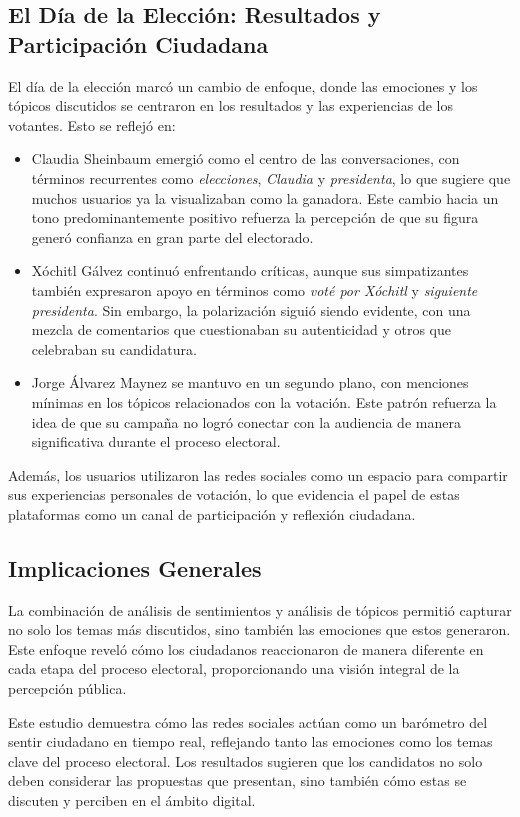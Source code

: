 \documentclass[10pt, a4paper]{article}
\begin{document}
	\subsection{El Día de la Elección: Resultados y Participación Ciudadana}
	El día de la elección marcó un cambio de enfoque, donde las emociones y los tópicos discutidos se centraron en los resultados y las experiencias de los votantes. Esto se reflejó en:
	\begin{itemize}
		\item Claudia Sheinbaum emergió como el centro de las conversaciones, con términos recurrentes como \textit{elecciones}, \textit{Claudia} y \textit{presidenta}, lo que sugiere que muchos usuarios ya la visualizaban como la ganadora. Este cambio hacia un tono predominantemente positivo refuerza la percepción de que su figura generó confianza en gran parte del electorado.
		\item Xóchitl Gálvez continuó enfrentando críticas, aunque sus simpatizantes también expresaron apoyo en términos como \textit{voté por Xóchitl} y \textit{siguiente presidenta}. Sin embargo, la polarización siguió siendo evidente, con una mezcla de comentarios que cuestionaban su autenticidad y otros que celebraban su candidatura.
		\item Jorge Álvarez Maynez se mantuvo en un segundo plano, con menciones mínimas en los tópicos relacionados con la votación. Este patrón refuerza la idea de que su campaña no logró conectar con la audiencia de manera significativa durante el proceso electoral.
	\end{itemize}
	
	Además, los usuarios utilizaron las redes sociales como un espacio para compartir sus experiencias personales de votación, lo que evidencia el papel de estas plataformas como un canal de participación y reflexión ciudadana.
		
	
	\subsection{Implicaciones Generales}
	
	La combinación de análisis de sentimientos y análisis de tópicos permitió capturar no solo los temas más discutidos, sino también las emociones que estos generaron. Este enfoque reveló cómo los ciudadanos reaccionaron de manera diferente en cada etapa del proceso electoral, proporcionando una visión integral de la percepción pública.
	
	Este estudio demuestra cómo las redes sociales actúan como un barómetro del sentir ciudadano en tiempo real, reflejando tanto las emociones como los temas clave del proceso electoral. Los resultados sugieren que los candidatos no solo deben considerar las propuestas que presentan, sino también cómo estas se discuten y perciben en el ámbito digital.
	
\end{document}
